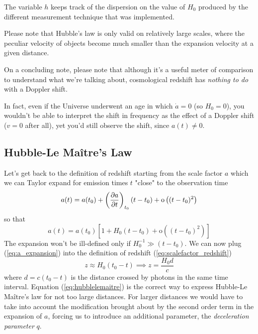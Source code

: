 The variable $h$ keeps track of the dispersion on the value of $H_{0}$ produced by the different measurement technique that was implemented.
\par Please note that Hubble's law is only valid on relatively large scales, where the peculiar velocity of objects become much smaller than the expansion velocity at a given distance.
\par On a concluding note, please note that although it's a useful meter of comparison to understand what we're talking about, cosmological redshift has \emph{nothing to do} with a Doppler shift.
\par In fact, even if the Universe underwent an age in which $\dot{a} = 0$  (so $H_{0} = 0$), you wouldn't be able to interpret the shift in frequency as the effect of a Doppler shift ($v = 0$ after all), yet you'd still observe the shift, since $a(t) \neq 0$.

\subsection{Hubble-Le Maître's Law}

Let's get back to the definition of redshift starting from the scale factor $a$ which we can Taylor expand for emission times $t$ "close" to the observation time
\begin{equation}
    a(t) = a(t_{0}) + \left(\frac{\partial a}{\partial t}\right)_{t_{0}}(t-t_{0}) + \text{o}\left((t-t_{0})^{2}\right)
\end{equation}
so that
\begin{equation}
    a(t) = a(t_{0})\left[1 + H_{0}(t-t_{0}) + \text{o}\left((t-t_{0})^{2}\right)\right]
    \label{eq:a_expansion}
\end{equation}
The expansion won't be ill-defined only if $H_{0}^{-1} \gg (t-t_{0})$. We can now plug (\ref{eq:a_expansion}) into the definition of redshift (\ref{eq:scalefactor_redshift})
\begin{equation}
    z \approx H_{0}(t_{0}-t) \implies z = \frac{H_{0}d}{c}
    \label{eq:hubblelemaitre}
\end{equation}
where $d = c(t_{0}-t)$ is the distance crossed by photons in the same time interval. Equation (\ref{eq:hubblelemaitre}) is the correct way to express Hubble-Le Maître's law for not too large distances. For larger distances we would have to take into account the modification brought about by the second order term in the expansion of $a$, forcing us to introduce an additional parameter, the \emph{deceleration parameter} $q$.

